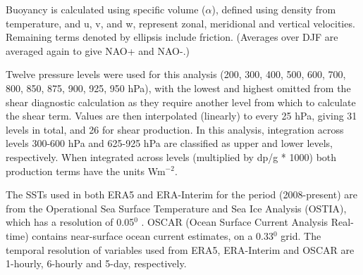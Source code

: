 
Buoyancy is calculated using specific volume ($\alpha$), defined using density from temperature, and u, v, and w, represent zonal, meridional and vertical velocities. Remaining terms denoted by ellipsis include friction. (Averages over DJF are averaged again to give NAO+ and NAO-.)

Twelve pressure levels were used for this analysis (200, 300, 400, 500, 600, 700, 800, 850, 875, 900, 925, 950 hPa), with the lowest and highest omitted from the shear diagnostic calculation as they require another level from which to calculate the shear term. Values are then interpolated (linearly) to every 25 hPa, giving 31 levels in total, and 26 for shear production. In this analysis, integration across levels 300-600 hPa and 625-925 hPa are classified as upper and lower levels, respectively. When integrated across levels (multiplied by dp/g * 1000) both production terms have the units Wm$^{-2}$. 

The SSTs used in both ERA5 and ERA-Interim for the period (2008-present) are from the Operational Sea Surface Temperature and Sea Ice Analysis (OSTIA), which has a resolution of 0.05$^{0}$ \citep{donlon2012operational}. OSCAR (Ocean Surface Current Analysis Real-time) \citep{Bonjean2002} contains near-surface ocean current estimates, on a 0.33$^{0}$ grid. The temporal resolution of variables used from ERA5, ERA-Interim and OSCAR are 1-hourly, 6-hourly and 5-day, respectively.


